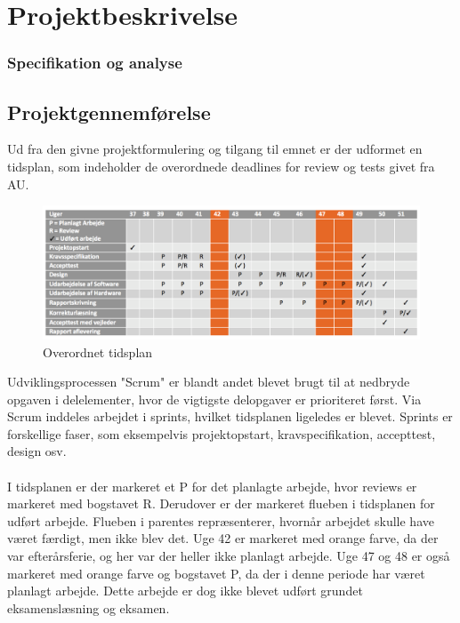 \chapter{Projektbeskrivelse}

\subsection{Specifikation og analyse}


\section{Projektgennemførelse}
Ud fra den givne projektformulering og tilgang til emnet er der udformet en tidsplan, som indeholder de overordnede deadlines for review og tests givet fra AU.
\begin{figure}[H]
	\centering
	\includegraphics[width=1\textwidth]{Figurer/Snip20151210_74.png}
	\caption{Overordnet tidsplan}
\end{figure}
Udviklingsprocessen "Scrum" er blandt andet blevet brugt til at nedbryde opgaven i delelementer, hvor de vigtigste delopgaver er prioriteret først. Via Scrum inddeles arbejdet i sprints, hvilket tidsplanen ligeledes er blevet. Sprints er forskellige faser, som eksempelvis projektopstart, kravspecifikation, accepttest, design osv.\\\\
I tidsplanen er der markeret et P for det planlagte arbejde, hvor reviews er markeret med bogstavet R. Derudover er der markeret flueben i tidsplanen for udført arbejde. Flueben i parentes repræsenterer, hvornår arbejdet skulle have været færdigt, men ikke blev det. Uge 42 er markeret med orange farve, da der var efterårsferie, og her var der heller ikke planlagt arbejde. Uge 47 og 48 er også markeret med orange farve og bogstavet P, da der i denne periode har været planlagt arbejde. Dette arbejde er dog ikke blevet udført grundet eksamenslæsning og eksamen.
\\\\
\\\\
\\\\
